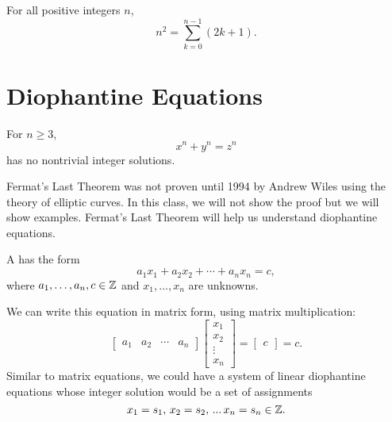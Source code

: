 \begin{proposition}\label{prop:squares} For all positive integers $n$,  $$n^{2} =\sum_{k=0}^{n-1}{(2k+1)}.$$
\end{proposition}

\section{Diophantine Equations} %

\begin{theorem} For $n \geq 3$, $$x^n + y^n = z^n$$ has no nontrivial integer solutions.
\end{theorem}

Fermat's Last Theorem was not proven until 1994 by Andrew Wiles using the theory of elliptic curves. In this class, we will not show the proof but we will show examples. Fermat's Last Theorem will help us understand diophantine equations.


\begin{definition}
A  has the form 
\[
a_1 x_1 + a_2 x_2 + \cdots + a_n x_n = c,
\]
where $a_1,\ldots,a_n, c \in \mathbb{Z}$ and $x_1,\ldots,x_n$ are unknowns.
\end{definition}

We can write this equation in  matrix form, using matrix multiplication:
$$\begin{bmatrix}
a_1 & a_2 & \cdots & a_n
\end{bmatrix}
\begin{bmatrix}
x_1 \\
x_2 \\
\vdots\\
x_n
\end{bmatrix}
=
\begin{bmatrix}
c
\end{bmatrix}
= c.$$
Similar to matrix equations, we could have a system of linear diophantine equations whose integer solution would be a set of assignments $$x_1 = s_1, \, x_2 = s_2, \, ... \, x_n = s_n \in \mathbb{Z}.$$

